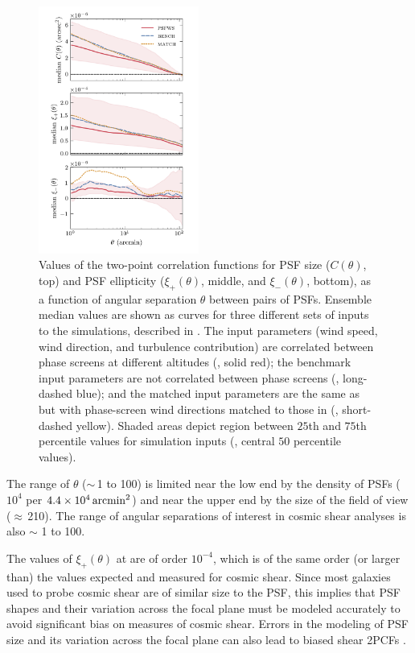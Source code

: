 \documentclass[twocolumn,twocolappendix]{openjournal}
\begin{document}
\begin{figure}
\includegraphics[width=0.47\textwidth]{f5_1d2pcf_ensemble.png}
    \caption{
    Values of the two-point correlation functions for PSF size ($C(\theta)$, top) and PSF ellipticity ($\xi_+(\theta)$, middle, and $\xi_-(\theta)$, bottom), as a function of angular separation $\theta$ between pairs of PSFs. 
    Ensemble median values are shown as curves for three different sets of inputs to the simulations, described in .  
    The \psfws input parameters (wind speed, wind direction, and turbulence contribution) are correlated between phase screens at different altitudes (\psfwssims, solid red);
    the benchmark input parameters are not correlated between phase screens (\bench, long-dashed blue); 
    and the matched input parameters are the same as \bench but with phase-screen wind directions matched to those in \psfws (\match, short-dashed yellow).  
    Shaded areas depict region between $25$th and $75$th percentile values for \psfwssims simulation inputs (\ie, central $50$ percentile values).
    \label{fig:1d2pcf}
    }
\end{figure}

The range of $\theta$ ($\sim$\,1 to 100\amin) is limited near the low end by the density of PSFs ($10^4$ per $4.4\times 10^4\mathrm{\,arcmin}^2$) and near the upper end by the size of the field of view ($\approx$\,210\amin ). 
The range of angular separations of interest in cosmic shear analyses is also $\sim$ 1 to 100\amin \citep[see, for example,][]{asgari_kids-1000_2021,amon_dark_2022, li_hyper_2023}.

The values of $\xi_+(\theta)$ at \smallsep are of order $10^{-4}$, which is of the same order (or larger than) the values expected and measured for cosmic shear.  
Since most galaxies used to probe cosmic shear are of similar size to the PSF, this implies that PSF shapes and their variation across the focal plane must be modeled accurately to avoid significant bias on measures of cosmic shear.  
Errors in the modeling of PSF size and its variation across the focal plane can also lead to biased shear 2PCFs \citep{rowe_improving_2010,jarvis_science_2016}.
\end{document}
